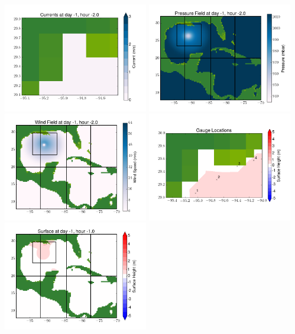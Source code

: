 \documentclass[11pt]{article}
\begin{document}
\vskip 10pt 
\includegraphics[width=0.475\textwidth]{frame0046fig7.png}
\includegraphics[width=0.475\textwidth]{frame0046fig8.png}
\vskip 10pt 
\includegraphics[width=0.475\textwidth]{frame0046fig9.png}
\includegraphics[width=0.475\textwidth]{frame0046fig10.png}
\vskip 10pt 
\includegraphics[width=0.475\textwidth]{frame0047fig1.png}
\end{document}
